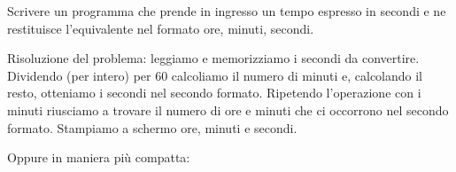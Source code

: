 \begin{Exercise}[label={ex:tempo}]
  Scrivere un programma che prende in ingresso un tempo espresso in secondi e ne restituisce l'equivalente nel formato ore, minuti, secondi.
\end{Exercise}

\begin{Answer}[ref={ex:tempo}]
	Risoluzione del problema: leggiamo e memorizziamo i secondi da convertire. Dividendo (per intero) per $60$ calcoliamo il numero di minuti e, calcolando il resto, otteniamo i secondi nel secondo formato. Ripetendo l'operazione con i minuti riusciamo a trovare il numero di ore e minuti che ci occorrono nel secondo formato. Stampiamo a schermo ore, minuti e secondi. 
  
  
  Oppure in maniera più compatta:
  
  
\end{Answer}
